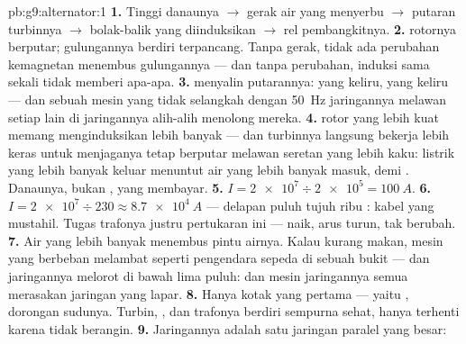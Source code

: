 \begin{solution}{pb:g9:alternator:1}
\textbf{1.} Tinggi danaunya $\to$ gerak air yang menyerbu
$\to$ putaran turbinnya $\to$  bolak-balik yang diinduksikan
 $\to$ rel  pembangkitnya.
\textbf{2.}  rotornya berputar; gulungannya berdiri terpancang.
Tanpa gerak, tidak ada perubahan kemagnetan menembus gulungannya ---
dan tanpa perubahan, induksi sama sekali tidak memberi apa-apa.
\textbf{3.}   menyalin putarannya:  yang
keliru,  yang keliru --- dan sebuah mesin yang tidak selangkah
dengan \qty{50}{Hz} jaringannya melawan setiap  lain di
jaringannya alih-alih menolong mereka.
\textbf{4.}  rotor yang lebih kuat memang menginduksikan lebih
banyak --- dan turbinnya langsung bekerja lebih keras untuk menjaganya
tetap berputar melawan seretan  yang lebih kaku: listrik yang
lebih banyak keluar menuntut air yang lebih banyak masuk,  demi
. Danaunya, bukan , yang membayar.
\textbf{5.} $I = \num{2e7} \div \num{2e5} = \qty{100}{A}$.
\textbf{6.} $I = \num{2e7} \div 230 \approx \qty{8.7e4}{A}$
--- delapan puluh tujuh ribu : kabel yang mustahil. Tugas
trafonya justru pertukaran ini ---  naik, arus turun, 
tak berubah.
\textbf{7.} Air yang lebih banyak menembus pintu airnya. Kalau kurang
makan, mesin yang berbeban melambat seperti pengendara sepeda di
sebuah bukit --- dan  jaringannya melorot di bawah lima puluh:
 dan mesin jaringannya semua merasakan jaringan yang lapar.
\textbf{8.} Hanya kotak yang pertama --- yaitu , dorongan
sudunya. Turbin, , dan trafonya berdiri sempurna sehat,
hanya terhenti karena tidak berangin.
\textbf{9.} Jaringannya adalah satu jaringan paralel yang besar:

\end{solution}
